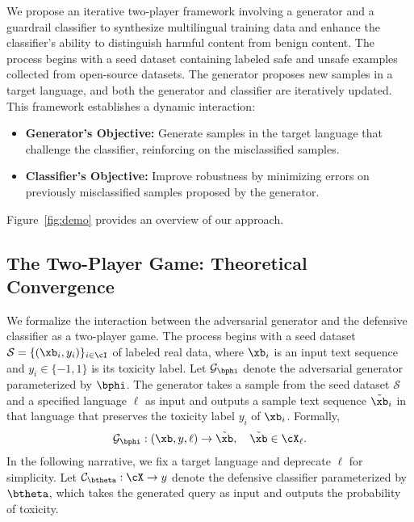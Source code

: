 We propose an iterative two-player framework involving a generator and a guardrail classifier to synthesize multilingual training data and enhance the classifier’s ability to distinguish harmful content from benign content. The process begins with a seed dataset containing labeled safe and unsafe examples collected from open-source datasets. The generator proposes new samples in a target language, and both the generator and classifier are iteratively updated. This framework establishes a dynamic interaction: 
\begin{itemize}[nosep,leftmargin=*]
    \item \textbf{Generator's Objective:} Generate samples in the target language that challenge the classifier, reinforcing on the misclassified samples.  
    \item \textbf{Classifier's Objective:} Improve robustness by minimizing errors on previously misclassified samples proposed by the generator.
\end{itemize}
Figure~\ref{fig:demo} provides an overview of our approach.


\subsection{The Two-Player Game: Theoretical Convergence}\label{sec:method}
We formalize the interaction between the adversarial generator and the defensive classifier as a two-player game. The process begins with a seed dataset $\mathcal{S}=\{(\xb_i,y_i)\}_{i\in\cI}$ of labeled real data, where $\xb_i$ is an input text sequence and $y_i\in\{-1,1\}$ is its toxicity label. Let $\mathcal{G}_{\bphi}$ denote the adversarial generator parameterized by $\bphi$. The generator takes a sample from the seed dataset $\mathcal{S}$ and a specified language $\ell$ as input and outputs a sample text sequence $\tilde{\xb}_i$ in that language that preserves the toxicity label $y_i$ of $\xb_i$. Formally,
\vspace{-1mm}
\begin{align*}
    \mathcal{G}_{\bphi}: (\xb, y, \ell) \rightarrow \tilde{\xb}, \quad \tilde{\xb} \in \cX_{\ell}.
\end{align*}
In the following narrative, we fix a target language and deprecate $\ell$ for simplicity. Let $\mathcal{C}_{\btheta}: \cX \rightarrow y$ denote the defensive classifier parameterized by $\btheta$, which takes the generated query as input and outputs the probability of toxicity. 

